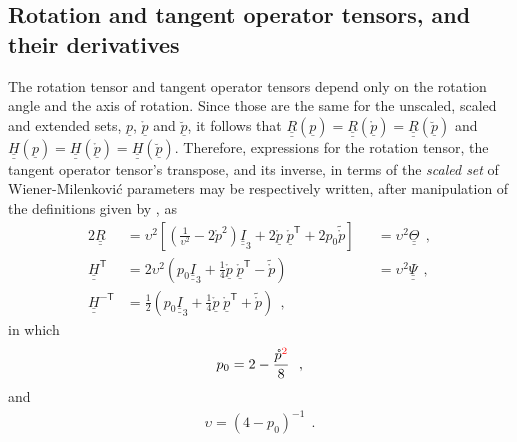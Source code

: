 \documentclass[12pt,a4paper,oneside,english]{abntex2} %
\newcommand{\fix}[1]{{\color{red}#1}}
\newcommand{\vect}[1]{\underline{#1}}
\def\tens#1{\underline{\underline{#1}}}
\def\til#1{\widetilde{#1}}
\def\lb{\left[}
\def\rb{\right]}
\def\lp{\left(}
\def\rp{\right)}
\def\T{\mathsf{T}}
\def\Ithree{\tens{I}_3}
\def\R{\tens{R}}
\def\H{\tens{H}}
\def\HT{\H^\T}
\def\HinvT{\H^{-\T}}
\def\p{\vect{p}}
\def\pscaled{\mathring{\p}}
\def\pscalednorm{\mathring{p}}
\def\ptilscl{\til{\mathring{p}}}
\def\pext{\breve{\p}}
\def\Th{\tens{\Theta}}
\begin{document}
\begin{apendicesenv}
\subsection{Rotation and tangent operator tensors, and their derivatives}

The rotation tensor and tangent operator tensors depend only on the rotation angle and the axis of rotation. Since those are the same for the unscaled, scaled and extended sets, $\p$, $\pscaled$ and $\pext$, it follows that $\R(\p) = \R(\pscaled) = \R(\pext)$ and $\H(\p) = \H(\pscaled) = \H(\pext)$. Therefore, expressions for the rotation tensor, the tangent operator tensor's transpose, and its inverse, in terms of the \textit{scaled set} of Wiener-Milenkovi\'{c} parameters may be respectively written, after manipulation of the definitions given by , as
\begin{alignat}{2}
    \R &= \upsilon^2 \lb \lp\frac{1}{\upsilon^2}-2\pscalednorm^2\rp\Ithree + 2\pscaled\;\pscaled^\T + 2p_0\ptilscl \rb &&= \upsilon^2\Th \ \ ,
    \label{eq:R_WM}
    \\
    \HT &= 2\upsilon^2 \lp p_0\Ithree + \frac{1}{4}\pscaled\;\pscaled^\T - \ptilscl \rp &&= \upsilon^2\tens{\Psi} \ \ ,
    \label{eq:HT_WM}
    \\
    \HinvT &= \frac{1}{2}\lp p_0\Ithree + \frac{1}{4}\pscaled\;\pscaled^\T + \ptilscl  \rp \ \ ,
    \label{eq:HinvT_WM}
\end{alignat}
in which 
\begin{align}
    p_0 = 2 - \frac{\pscalednorm\fix{^2}}{8} \ \ ,
    \label{eq:p0}
\end{align}
and 
\begin{align}
    \upsilon = \lp4-p_0\rp^{-1} \ \ .
    \label{eq:upsilon}
\end{align}


\end{apendicesenv}
\end{document}
